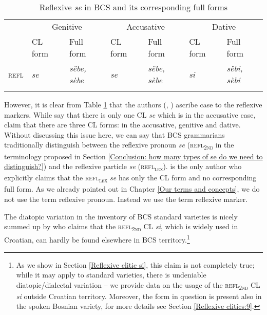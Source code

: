 \begin{table}
\caption{Reflexive \textit{se} in BCS and its corresponding full forms\label{table:reflex}}
\begin{tabular}{lllllll}
\lsptoprule
&\multicolumn{2}{c}{Genitive} & \multicolumn{2}{c}{Accusative}& \multicolumn{2}{c}{Dative}\\\cmidrule(lr){2-3}\cmidrule(lr){4-5}\cmidrule(lr){6-7}
& CL form & Full form & CL form & Full form & CL form & Full form\\\midrule
\textsc{refl} & \textit{se} & \textit{sȅbe, sèbe} & \textit{se} & \textit{sȅbe, sèbe} & \textit{si} & \textit{sȅbi, sèbi}\\
\lspbottomrule
\end{tabular}
\end{table}


However, it is clear from Table \ref{table:reflex} that the authors (\citealt[e.g.][208]{Baric97}, \citealt[367]{MrazovicVukadinovic09}) ascribe case to the reflexive markers. While \citet[367]{MrazovicVukadinovic09} say that there is only one CL \textit{se} which is in the accusative case, \citet[208]{Baric97} claim that there are three CL forms: in the accusative, genitive and dative. Without discussing this issue here, we can say that BCS grammarians traditionally distinguish between the reflexive pronoun \textit{se} (\textsc{refl\textsubscript{2nd}} in the terminology proposed in Section \ref{Conclusion: how many types of se do we need to distinguish?}) and the reflexive particle \textit{se} (\textsc{refl\textsubscript{lex}}). \citet[558f]{Ridjanovic12} is the only author who explicitly claims that the \textsc{refl\textsubscript{lex}} \textit{se} has only the CL form and no corresponding full form. As we already pointed out in Chapter \ref{Our terms and concepts}, we do not use the term reflexive pronoun. Instead we use the term reflexive marker.

The diatopic variation in the inventory of BCS standard varieties is nicely summed up by \citet[440]{Ridjanovic12} who claims that the \textsc{refl\textsubscript{2nd}} CL \textit{si}, which is widely used in Croatian, can hardly be found elsewhere in BCS territory.\footnote{As we show in Section \ref{Reflexive clitic si}, this claim is not completely true; while it may apply to standard varieties, there is undeniable diatopic/dialectal variation – we provide data on the usage of the \textsc{refl\textsubscript{2nd}} CL \textit{si} outside Croatian territory. Moreover, the form in question is present also in the spoken Bosnian variety, for more details see Section \ref{Reflexive clitics:9}.}

